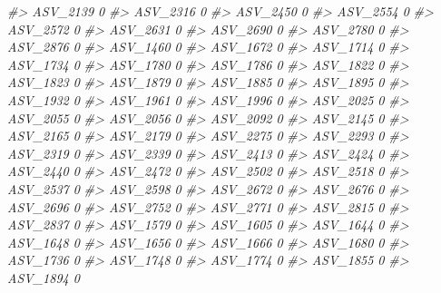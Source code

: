 \documentclass[
]{article}
\newenvironment{Shaded}{\begin{snugshade}}{\end{snugshade}}
\newcommand{\CommentTok}[1]{\textcolor[rgb]{0.56,0.35,0.01}{\textit{#1}}}
\begin{document}
\begin{Shaded}
\begin{Highlighting}[]
\CommentTok{\#\textgreater{} ASV\_2139  0}
\CommentTok{\#\textgreater{} ASV\_2316  0}
\CommentTok{\#\textgreater{} ASV\_2450  0}
\CommentTok{\#\textgreater{} ASV\_2554  0}
\CommentTok{\#\textgreater{} ASV\_2572  0}
\CommentTok{\#\textgreater{} ASV\_2631  0}
\CommentTok{\#\textgreater{} ASV\_2690  0}
\CommentTok{\#\textgreater{} ASV\_2780  0}
\CommentTok{\#\textgreater{} ASV\_2876  0}
\CommentTok{\#\textgreater{} ASV\_1460  0}
\CommentTok{\#\textgreater{} ASV\_1672  0}
\CommentTok{\#\textgreater{} ASV\_1714  0}
\CommentTok{\#\textgreater{} ASV\_1734  0}
\CommentTok{\#\textgreater{} ASV\_1780  0}
\CommentTok{\#\textgreater{} ASV\_1786  0}
\CommentTok{\#\textgreater{} ASV\_1822  0}
\CommentTok{\#\textgreater{} ASV\_1823  0}
\CommentTok{\#\textgreater{} ASV\_1879  0}
\CommentTok{\#\textgreater{} ASV\_1885  0}
\CommentTok{\#\textgreater{} ASV\_1895  0}
\CommentTok{\#\textgreater{} ASV\_1932  0}
\CommentTok{\#\textgreater{} ASV\_1961  0}
\CommentTok{\#\textgreater{} ASV\_1996  0}
\CommentTok{\#\textgreater{} ASV\_2025  0}
\CommentTok{\#\textgreater{} ASV\_2055  0}
\CommentTok{\#\textgreater{} ASV\_2056  0}
\CommentTok{\#\textgreater{} ASV\_2092  0}
\CommentTok{\#\textgreater{} ASV\_2145  0}
\CommentTok{\#\textgreater{} ASV\_2165  0}
\CommentTok{\#\textgreater{} ASV\_2179  0}
\CommentTok{\#\textgreater{} ASV\_2275  0}
\CommentTok{\#\textgreater{} ASV\_2293  0}
\CommentTok{\#\textgreater{} ASV\_2319  0}
\CommentTok{\#\textgreater{} ASV\_2339  0}
\CommentTok{\#\textgreater{} ASV\_2413  0}
\CommentTok{\#\textgreater{} ASV\_2424  0}
\CommentTok{\#\textgreater{} ASV\_2440  0}
\CommentTok{\#\textgreater{} ASV\_2472  0}
\CommentTok{\#\textgreater{} ASV\_2502  0}
\CommentTok{\#\textgreater{} ASV\_2518  0}
\CommentTok{\#\textgreater{} ASV\_2537  0}
\CommentTok{\#\textgreater{} ASV\_2598  0}
\CommentTok{\#\textgreater{} ASV\_2672  0}
\CommentTok{\#\textgreater{} ASV\_2676  0}
\CommentTok{\#\textgreater{} ASV\_2696  0}
\CommentTok{\#\textgreater{} ASV\_2752  0}
\CommentTok{\#\textgreater{} ASV\_2771  0}
\CommentTok{\#\textgreater{} ASV\_2815  0}
\CommentTok{\#\textgreater{} ASV\_2837  0}
\CommentTok{\#\textgreater{} ASV\_1579  0}
\CommentTok{\#\textgreater{} ASV\_1605  0}
\CommentTok{\#\textgreater{} ASV\_1644  0}
\CommentTok{\#\textgreater{} ASV\_1648  0}
\CommentTok{\#\textgreater{} ASV\_1656  0}
\CommentTok{\#\textgreater{} ASV\_1666  0}
\CommentTok{\#\textgreater{} ASV\_1680  0}
\CommentTok{\#\textgreater{} ASV\_1736  0}
\CommentTok{\#\textgreater{} ASV\_1748  0}
\CommentTok{\#\textgreater{} ASV\_1774  0}
\CommentTok{\#\textgreater{} ASV\_1855  0}
\CommentTok{\#\textgreater{} ASV\_1894  0}

\end{Highlighting}
\end{Shaded}
\end{document}
